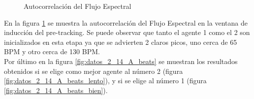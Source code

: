 \documentclass[12pt,a4paper,titlepage]{report}
\begin{document}
\begin{figure} [h!]
\centering
  \caption{Autocorrelación del Flujo Espectral}
  \label{fig:datos_2_14_A_autocorrelaciones}
\end{figure}

En la figura \ref{fig:datos_2_14_A_autocorrelaciones} se muestra la autocorrelación del Flujo Espectral en la ventana de inducción del pre-tracking. Se puede observar que tanto el agente 1 como el 2 son inicializados en esta etapa ya que se advierten 2 claros picos, uno cerca de 65 BPM y otro cerca de 130 BPM.\\

Por último en la figura \ref{fig:datos_2_14_A_beats} se muestran los resultados obtenidos si se elige como mejor agente al número 2 (figura \ref{fig:datos_2_14_A_beats_lento}), y si se elige al número 1 (figura \ref{fig:datos_2_14_A_beats_bien}).\\
\end{document}
